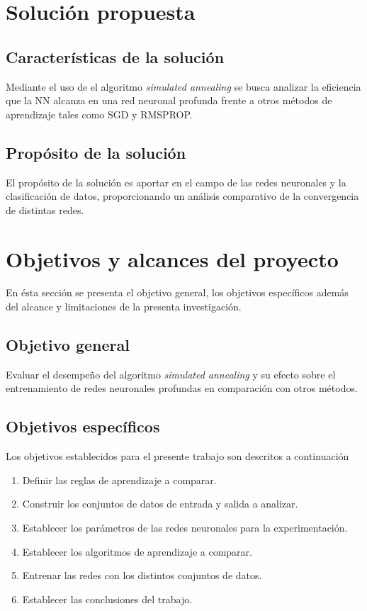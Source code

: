 \section{Solución propuesta}
\subsection{Características de la solución}
Mediante el uso de el algoritmo {\em simulated annealing} se busca analizar la eficiencia que la NN alcanza en una red neuronal profunda frente a otros métodos de aprendizaje tales como SGD y RMSPROP.

\subsection{Propósito de la solución}
El propósito de la solución es aportar en el campo de las redes neuronales y la clasificación de datos, proporcionando un análisis comparativo de la convergencia de distintas redes.

\section{Objetivos y alcances del proyecto}
En ésta sección se presenta el objetivo general, los objetivos específicos además del alcance y limitaciones de la presenta investigación.

\subsection{Objetivo general}
Evaluar el desempeño del algoritmo {\em simulated annealing} y su efecto sobre el entrenamiento de redes neuronales profundas en comparación con otros métodos.

\subsection{Objetivos específicos}
Los objetivos establecidos para el presente trabajo son descritos a continuación
\begin{enumerate}
	\item Definir las reglas de aprendizaje a comparar.
	\item Construir los conjuntos de datos de entrada y salida a analizar.
	\item Establecer los parámetros de las redes neuronales para la experimentación.
	\item Establecer los algoritmos de aprendizaje a comparar.
	\item Entrenar las redes con los distintos conjuntos de datos.
	\item Establecer las conclusiones del trabajo.
\end{enumerate}

